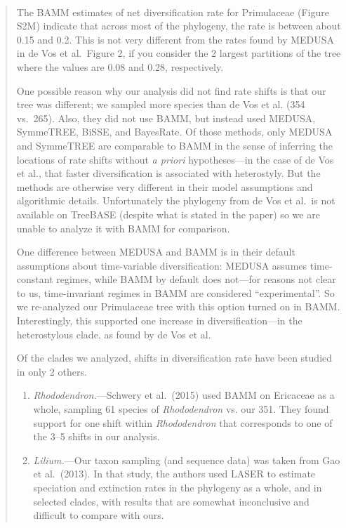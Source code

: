 \documentclass[11pt]{letter}
\begin{document}
\begin{letter}{ \\

}
\begin{enumerate}
  \begin{quote}
    The BAMM estimates of net diversification rate for Primulaceae
    (Figure S2M) indicate that across most of the phylogeny, the rate
    is between about 0.15 and 0.2. This is not very different from the
    rates found by MEDUSA in de Vos et al.\ Figure 2, if you consider
    the 2 largest partitions of the tree where the values are 0.08 and
    0.28, respectively.

    One possible reason why our analysis did not find rate shifts is
    that our tree was different; we sampled more species than de Vos
    et al. (354 vs.\ 265). Also, they did not use BAMM, but instead
    used MEDUSA, SymmeTREE, BiSSE, and BayesRate. Of those methods,
    only MEDUSA and SymmeTREE are comparable to BAMM in the sense of
    inferring the locations of rate shifts without \textit{a priori}
    hypotheses---in the case of de Vos et al., that faster
    diversification is associated with heterostyly. But the methods
    are otherwise very different in their model assumptions and
    algorithmic details. Unfortunately the phylogeny from de Vos et
    al.\ is not available on TreeBASE (despite what is stated in the
    paper) so we are unable to analyze it with BAMM for comparison.

    One difference between MEDUSA and BAMM is in their default
    assumptions about time-variable diversification: MEDUSA assumes
    time-constant regimes, while BAMM by default does not---for
    reasons not clear to us, time-invariant regimes in BAMM are
    considered ``experimental''. So we re-analyzed our Primulaceae
    tree with this option turned on in BAMM. Interestingly, this
    supported one increase in diversification---in the heterostylous
    clade, as found by de Vos et al.

    Of the clades we analyzed, shifts in diversification rate have
    been studied in only 2 others.

    \begin{enumerate}[parsep=2pt,itemsep=2pt]
    \item \textit{Rhododendron.}---Schwery et al.\ (2015) used BAMM on
      Ericaceae as a whole, sampling 61 species of
      \textit{Rhododendron} vs. our 351. They found support for one
      shift within \textit{Rhododendron} that corresponds to one of
      the 3--5 shifts in our analysis.

    \item \textit{Lilium.}---Our taxon sampling (and sequence data)
      was taken from Gao et al.\ (2013). In that study, the authors
      used LASER to estimate speciation and extinction rates in the
      phylogeny as a whole, and in selected clades, with results that
      are somewhat inconclusive and difficult to compare with ours.
    \end{enumerate}


\end{quote}
\end{enumerate}
\end{letter}
\end{document}
